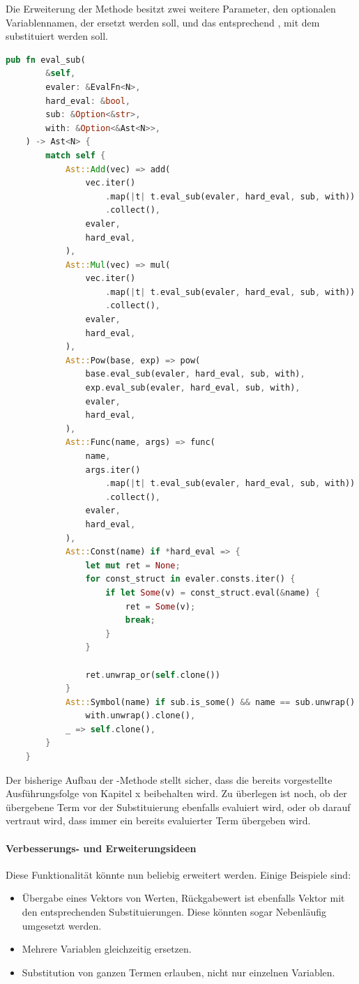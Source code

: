 \documentclass[11pt,a4paper, ngerman]{article}
\begin{document}
Die Erweiterung der Methode besitzt zwei weitere Parameter, den optionalen Variablennamen, der ersetzt werden soll, und das entsprechend , mit dem substituiert werden soll.
\begin{lstlisting}[language=rust, caption={Erweiterung pub fn eval}]
    pub fn eval_sub(
        &self,
        evaler: &EvalFn<N>,
        hard_eval: &bool,
        sub: &Option<&str>,
        with: &Option<&Ast<N>>,
    ) -> Ast<N> {
        match self {
            Ast::Add(vec) => add(
                vec.iter()
                    .map(|t| t.eval_sub(evaler, hard_eval, sub, with))
                    .collect(),
                evaler,
                hard_eval,
            ),
            Ast::Mul(vec) => mul(
                vec.iter()
                    .map(|t| t.eval_sub(evaler, hard_eval, sub, with))
                    .collect(),
                evaler,
                hard_eval,
            ),
            Ast::Pow(base, exp) => pow(
                base.eval_sub(evaler, hard_eval, sub, with),
                exp.eval_sub(evaler, hard_eval, sub, with),
                evaler,
                hard_eval,
            ),
            Ast::Func(name, args) => func(
                name,
                args.iter()
                    .map(|t| t.eval_sub(evaler, hard_eval, sub, with))
                    .collect(),
                evaler,
                hard_eval,
            ),
            Ast::Const(name) if *hard_eval => {
                let mut ret = None;
                for const_struct in evaler.consts.iter() {
                    if let Some(v) = const_struct.eval(&name) {
                        ret = Some(v);
                        break;
                    }
                }

                ret.unwrap_or(self.clone())
            }
            Ast::Symbol(name) if sub.is_some() && name == sub.unwrap() => 
                with.unwrap().clone(),
            _ => self.clone(),
        }
    }
\end{lstlisting}

Der bisherige Aufbau der -Methode stellt sicher, dass die bereits vorgestellte Ausführungsfolge von Kapitel x beibehalten wird. Zu überlegen ist noch, ob der übergebene Term vor der Substituierung ebenfalls evaluiert wird, oder ob darauf vertraut wird, dass immer ein bereits evaluierter Term übergeben wird.

\paragraph{Verbesserungs- und Erweiterungsideen} Diese Funktionalität könnte nun beliebig erweitert werden. Einige Beispiele sind:
\begin{itemize}
    \item Übergabe eines Vektors von Werten, Rückgabewert ist ebenfalls Vektor mit den entsprechenden Substituierungen. Diese könnten sogar Nebenläufig umgesetzt werden.
    \item Mehrere Variablen gleichzeitig ersetzen.
    \item Substitution von ganzen Termen erlauben, nicht nur einzelnen Variablen.
\end{itemize}
\end{document}
